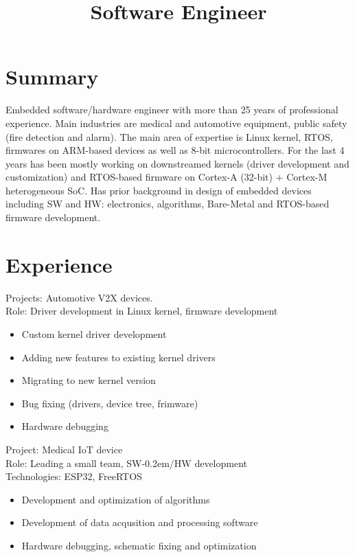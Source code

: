 \documentclass[11pt,a4paper]{moderncv}
\title{Software Engineer}
\begin{document}
\renewcommand*{\bibliographyhead}[1]{}

\maketitle

\section{Summary}
Embedded software/hardware engineer with more than 25 years of professional experience.
Main industries are medical and automotive equipment, public safety (fire detection and alarm).
The main area of expertise is Linux kernel, RTOS, firmwares on ARM-based devices
as well as 8-bit microcontrollers.
For the last 4 years has been mostly working on downstreamed kernels (driver development and customization) and
RTOS-based firmware on Cortex-A (32-bit) + Cortex-M heterogeneous SoC.
Has prior background in design of embedded devices including SW and HW: electronics, algorithms,
Bare-Metal and RTOS-based firmware development.

\section{Experience}

  {Projects: Automotive V2X devices.\\
    Role: Driver development in Linux kernel, firmware development
    \begin{itemize}
      \item Custom kernel driver development
      \item Adding new features to existing kernel drivers
      \item Migrating to new kernel version
      \item Bug fixing (drivers, device tree, frimware)
      \item Hardware debugging
    \end{itemize}}

  {Project: Medical IoT device\\
    Role: Leading a small team, SW\kern-0.2em/HW development\\
    Technologies: ESP32, FreeRTOS
    \begin{itemize}
      \item Development and optimization of algorithms
      \item Development of data acqusition and processing software
      \item Hardware debugging, schematic fixing and optimization
    \end{itemize}}
\end{document}
